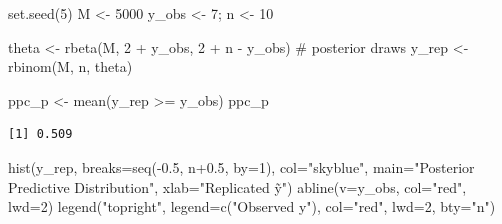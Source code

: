 \documentclass[
  letterpaper,
  DIV=11,
  numbers=noendperiod]{scrreprt}
\newenvironment{Shaded}{\begin{snugshade}}{\end{snugshade}}
\newcommand{\AttributeTok}[1]{\textcolor[rgb]{0.40,0.45,0.13}{#1}}
\newcommand{\CommentTok}[1]{\textcolor[rgb]{0.37,0.37,0.37}{#1}}
\newcommand{\DecValTok}[1]{\textcolor[rgb]{0.68,0.00,0.00}{#1}}
\newcommand{\FloatTok}[1]{\textcolor[rgb]{0.68,0.00,0.00}{#1}}
\newcommand{\FunctionTok}[1]{\textcolor[rgb]{0.28,0.35,0.67}{#1}}
\newcommand{\NormalTok}[1]{\textcolor[rgb]{0.00,0.23,0.31}{#1}}
\newcommand{\OtherTok}[1]{\textcolor[rgb]{0.00,0.23,0.31}{#1}}
\newcommand{\SpecialCharTok}[1]{\textcolor[rgb]{0.37,0.37,0.37}{#1}}
\newcommand{\StringTok}[1]{\textcolor[rgb]{0.13,0.47,0.30}{#1}}
\begin{document}
\begin{Shaded}
\begin{Highlighting}[]
\FunctionTok{set.seed}\NormalTok{(}\DecValTok{5}\NormalTok{)}
\NormalTok{M }\OtherTok{\textless{}{-}} \DecValTok{5000}
\NormalTok{y\_obs }\OtherTok{\textless{}{-}} \DecValTok{7}\NormalTok{; n }\OtherTok{\textless{}{-}} \DecValTok{10}

\NormalTok{theta }\OtherTok{\textless{}{-}} \FunctionTok{rbeta}\NormalTok{(M, }\DecValTok{2} \SpecialCharTok{+}\NormalTok{ y\_obs, }\DecValTok{2} \SpecialCharTok{+}\NormalTok{ n }\SpecialCharTok{{-}}\NormalTok{ y\_obs)   }\CommentTok{\# posterior draws}
\NormalTok{y\_rep }\OtherTok{\textless{}{-}} \FunctionTok{rbinom}\NormalTok{(M, n, theta)}

\NormalTok{ppc\_p }\OtherTok{\textless{}{-}} \FunctionTok{mean}\NormalTok{(y\_rep }\SpecialCharTok{\textgreater{}=}\NormalTok{ y\_obs)}
\NormalTok{ppc\_p}
\end{Highlighting}
\end{Shaded}

\begin{verbatim}
[1] 0.509
\end{verbatim}

\begin{Shaded}
\begin{Highlighting}[]
\FunctionTok{hist}\NormalTok{(y\_rep, }\AttributeTok{breaks=}\FunctionTok{seq}\NormalTok{(}\SpecialCharTok{{-}}\FloatTok{0.5}\NormalTok{, n}\FloatTok{+0.5}\NormalTok{, }\AttributeTok{by=}\DecValTok{1}\NormalTok{),}
     \AttributeTok{col=}\StringTok{"skyblue"}\NormalTok{, }\AttributeTok{main=}\StringTok{"Posterior Predictive Distribution"}\NormalTok{, }\AttributeTok{xlab=}\StringTok{"Replicated ỹ"}\NormalTok{)}
\FunctionTok{abline}\NormalTok{(}\AttributeTok{v=}\NormalTok{y\_obs, }\AttributeTok{col=}\StringTok{"red"}\NormalTok{, }\AttributeTok{lwd=}\DecValTok{2}\NormalTok{)}
\FunctionTok{legend}\NormalTok{(}\StringTok{"topright"}\NormalTok{, }\AttributeTok{legend=}\FunctionTok{c}\NormalTok{(}\StringTok{"Observed y"}\NormalTok{), }\AttributeTok{col=}\StringTok{"red"}\NormalTok{, }\AttributeTok{lwd=}\DecValTok{2}\NormalTok{, }\AttributeTok{bty=}\StringTok{"n"}\NormalTok{)}
\end{Highlighting}
\end{Shaded}
\end{document}
